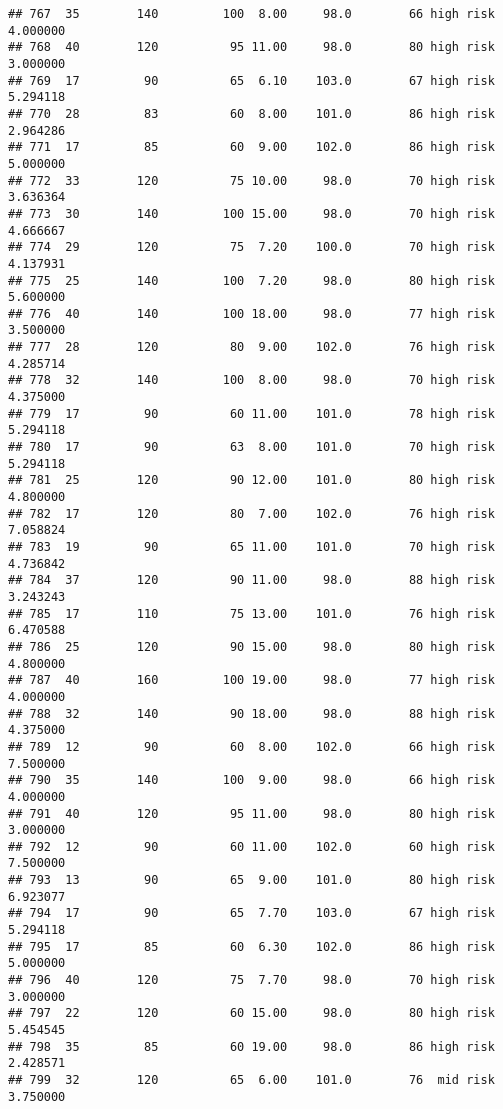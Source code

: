 \documentclass[
  ignorenonframetext,
]{beamer}
\begin{document}
\begin{frame}[fragile]
\begin{verbatim}
## 767  35        140         100  8.00     98.0        66 high risk      4.000000
## 768  40        120          95 11.00     98.0        80 high risk      3.000000
## 769  17         90          65  6.10    103.0        67 high risk      5.294118
## 770  28         83          60  8.00    101.0        86 high risk      2.964286
## 771  17         85          60  9.00    102.0        86 high risk      5.000000
## 772  33        120          75 10.00     98.0        70 high risk      3.636364
## 773  30        140         100 15.00     98.0        70 high risk      4.666667
## 774  29        120          75  7.20    100.0        70 high risk      4.137931
## 775  25        140         100  7.20     98.0        80 high risk      5.600000
## 776  40        140         100 18.00     98.0        77 high risk      3.500000
## 777  28        120          80  9.00    102.0        76 high risk      4.285714
## 778  32        140         100  8.00     98.0        70 high risk      4.375000
## 779  17         90          60 11.00    101.0        78 high risk      5.294118
## 780  17         90          63  8.00    101.0        70 high risk      5.294118
## 781  25        120          90 12.00    101.0        80 high risk      4.800000
## 782  17        120          80  7.00    102.0        76 high risk      7.058824
## 783  19         90          65 11.00    101.0        70 high risk      4.736842
## 784  37        120          90 11.00     98.0        88 high risk      3.243243
## 785  17        110          75 13.00    101.0        76 high risk      6.470588
## 786  25        120          90 15.00     98.0        80 high risk      4.800000
## 787  40        160         100 19.00     98.0        77 high risk      4.000000
## 788  32        140          90 18.00     98.0        88 high risk      4.375000
## 789  12         90          60  8.00    102.0        66 high risk      7.500000
## 790  35        140         100  9.00     98.0        66 high risk      4.000000
## 791  40        120          95 11.00     98.0        80 high risk      3.000000
## 792  12         90          60 11.00    102.0        60 high risk      7.500000
## 793  13         90          65  9.00    101.0        80 high risk      6.923077
## 794  17         90          65  7.70    103.0        67 high risk      5.294118
## 795  17         85          60  6.30    102.0        86 high risk      5.000000
## 796  40        120          75  7.70     98.0        70 high risk      3.000000
## 797  22        120          60 15.00     98.0        80 high risk      5.454545
## 798  35         85          60 19.00     98.0        86 high risk      2.428571
## 799  32        120          65  6.00    101.0        76  mid risk      3.750000
\end{verbatim}


\end{frame}
\end{document}
